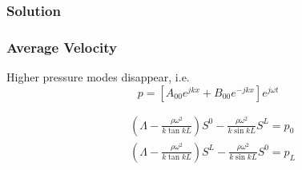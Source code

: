 \documentclass{beamer}
\begin{document}
\subsubsection{Solution}
\begin{frame}
 \frametitle{Average Velocity}
\begin{exampleblock}{}
Higher pressure modes disappear, i.e. \[p=\left[A_{00}e^{jkx}+B_{00}e^{-jkx}\right]e^{j\omega t}\]

 \begin{align*}
 &\left(\Lambda-\frac{\rho\omega^2}{k\tan kL}\right)S^0-\frac{\rho\omega^2}{k\sin kL}S^L=p_{0}\\
 &\left(\Lambda-\frac{\rho\omega^2}{k\tan kL}\right)S^L-\frac{\rho\omega^2}{k\sin kL}S^0=p_{L}
\end{align*}
\end{exampleblock}
 


\end{frame}
\end{document}
